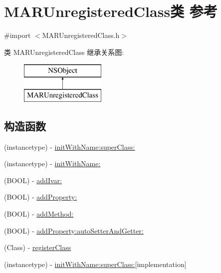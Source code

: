 \hypertarget{interface_m_a_r_unregistered_class}{}\section{M\+A\+R\+Unregistered\+Class类 参考}
\label{interface_m_a_r_unregistered_class}


{\ttfamily \#import $<$M\+A\+R\+Unregistered\+Class.\+h$>$}

类 M\+A\+R\+Unregistered\+Class 继承关系图\+:\begin{figure}[H]
\begin{center}
\leavevmode
\includegraphics[height=2.000000cm]{interface_m_a_r_unregistered_class}
\end{center}
\end{figure}
\subsection*{构造函数}
\begin{DoxyCompactItemize}
\item 
(instancetype) -\/ \hyperlink{interface_m_a_r_unregistered_class_a7a4f72a3aa0d04a4f473e9acaf1d9018}{init\+With\+Name\+:super\+Class\+:}
\item 
(instancetype) -\/ \hyperlink{interface_m_a_r_unregistered_class_a30a663a7d2fe88bd68a3480a586985e2}{init\+With\+Name\+:}
\item 
(B\+O\+OL) -\/ \hyperlink{interface_m_a_r_unregistered_class_aabe94edfff3f8a4701bcdb0867506321}{add\+Ivar\+:}
\item 
(B\+O\+OL) -\/ \hyperlink{interface_m_a_r_unregistered_class_afe38f5df71ee6cdcdf4b890b4d1c5a43}{add\+Property\+:}
\item 
(B\+O\+OL) -\/ \hyperlink{interface_m_a_r_unregistered_class_aa1fa89502ef87defac0e218b232d49d3}{add\+Method\+:}
\item 
(B\+O\+OL) -\/ \hyperlink{interface_m_a_r_unregistered_class_ae488ab11298cf080a4e69df914a0089f}{add\+Property\+:auto\+Setter\+And\+Getter\+:}
\item 
(Class) -\/ \hyperlink{interface_m_a_r_unregistered_class_aa7a1d3613bbd77fc0e08de84385e569e}{register\+Class}
\item 
(instancetype) -\/ \hyperlink{interface_m_a_r_unregistered_class_abfa98d3cee7f2ba82a78b533d17238b4}{init\+With\+Name\+:super\+Class\+:}{\ttfamily  \mbox{[}implementation\mbox{]}}
\end{DoxyCompactItemize}
